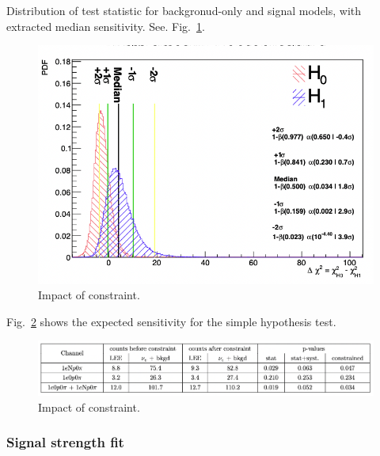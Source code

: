 \documentclass{article}
\begin{document}
Distribution of test statistic for backgronud-only and signal models, with extracted median sensitivity. See. Fig.~\ref{fig:simplehypothesis}.

\begin{center}
\begin{figure}[h]
    \includegraphics[width=1.00\textwidth]{technote/images/simplehypothesis.png}
    \caption{\label{fig:simplehypothesis} Impact of constraint.}
\end{figure}
\end{center}

Fig.~\ref{fig:simplehypothesisresults} shows the expected sensitivity for the simple hypothesis test.

\begin{center}
\begin{figure}[h]
    \includegraphics[width=1.00\textwidth]{technote/images/simplehypothesisresults.png}
    \caption{\label{fig:simplehypothesisresults} Impact of constraint.}
\end{figure}
\end{center}

\newpage
\subsubsection{Signal strength fit}
\end{document}
